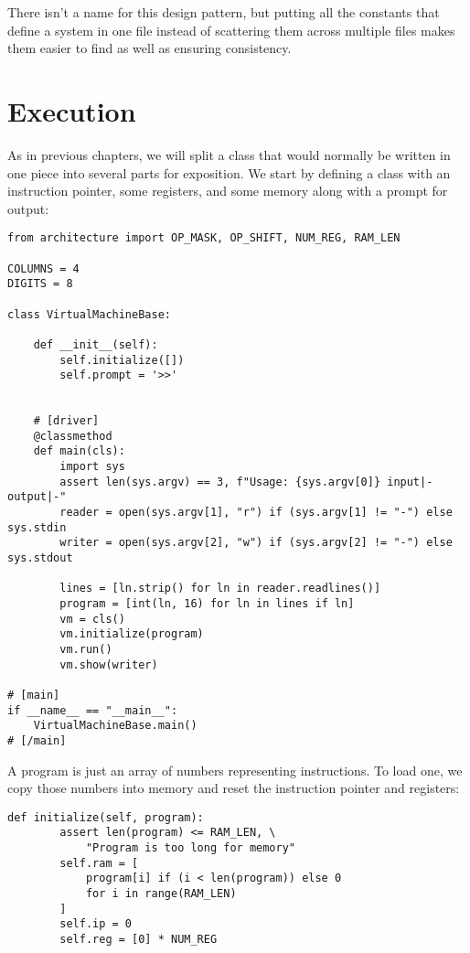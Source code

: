 \documentclass{scrbook}
\begin{document}
\noindent There isn't a name for this design pattern,
but putting all the constants that define a system in one file
instead of scattering them across multiple files
makes them easier to find as well as ensuring consistency.

\section{Execution}\label{vm-execute}


As in previous chapters,
we will split a class that would normally be written in one piece into several parts for exposition.
We start by defining a class with an instruction pointer, some registers, and some memory
along with a prompt for output:


\begin{lstlisting}[frame=single,frameround=tttt]
from architecture import OP_MASK, OP_SHIFT, NUM_REG, RAM_LEN

COLUMNS = 4
DIGITS = 8

class VirtualMachineBase:

    def __init__(self):
        self.initialize([])
        self.prompt = '>>'


    # [driver]
    @classmethod
    def main(cls):
        import sys
        assert len(sys.argv) == 3, f"Usage: {sys.argv[0]} input|- output|-"
        reader = open(sys.argv[1], "r") if (sys.argv[1] != "-") else sys.stdin
        writer = open(sys.argv[2], "w") if (sys.argv[2] != "-") else sys.stdout

        lines = [ln.strip() for ln in reader.readlines()]
        program = [int(ln, 16) for ln in lines if ln]
        vm = cls()
        vm.initialize(program)
        vm.run()
        vm.show(writer)

# [main]
if __name__ == "__main__":
    VirtualMachineBase.main()
# [/main]
\end{lstlisting}



A program is just an array of numbers representing instructions.
To load one,
we copy those numbers into memory and reset the instruction pointer and registers:


\begin{lstlisting}[frame=single,frameround=tttt]
    def initialize(self, program):
        assert len(program) <= RAM_LEN, \
            "Program is too long for memory"
        self.ram = [
            program[i] if (i < len(program)) else 0
            for i in range(RAM_LEN)
        ]
        self.ip = 0
        self.reg = [0] * NUM_REG
\end{lstlisting}
\end{document}
